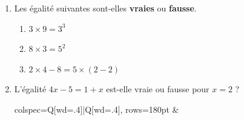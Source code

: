 \documentclass[activite]{thedocument}
\begin{document}
    \begin{enumerate}
        \item Les égalité suivantes sont-elles {\bfseries vraies} ou {\bfseries fausse}.
        \begin{enumerate}
            \item $3\times 9=3^3$\vskip 50pt
            \item $8\times3=5^2$\vskip 50pt
            \item $2\times4-8=5\times(2-2)$\vskip 50pt
        \end{enumerate}
        \item L'égalité $4x-5=1+x$ est-elle vraie ou fausse pour $x=2$ ?
        \vskip 15pt
        \begin{tblr}{
            colspec={Q[wd=.4\linewidth]|Q[wd=.4\linewidth]},
            rows={180pt}
            }
        &
        \end{tblr}
    \end{enumerate}
\end{document}
